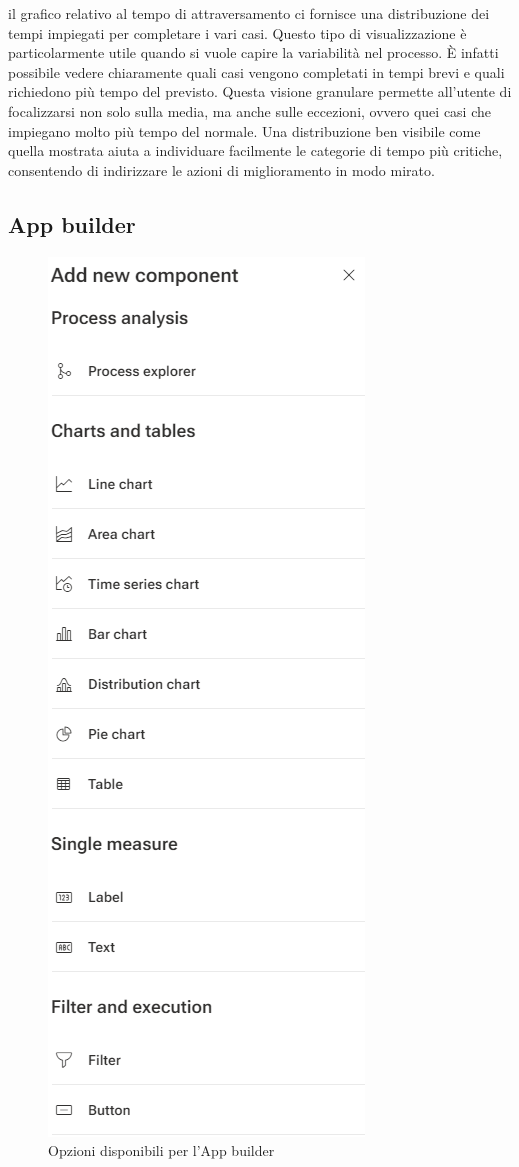 \documentclass{article}
\begin{document}
il grafico relativo al tempo di attraversamento ci fornisce una distribuzione dei tempi impiegati per completare i vari casi. Questo tipo di visualizzazione è particolarmente utile quando si vuole capire la variabilità nel processo. È infatti possibile vedere chiaramente quali casi vengono completati in tempi brevi e quali richiedono più tempo del previsto. Questa visione granulare permette all’utente di focalizzarsi non solo sulla media, ma anche sulle eccezioni, ovvero quei casi che impiegano molto più tempo del normale. Una distribuzione ben visibile come quella mostrata aiuta a individuare facilmente le categorie di tempo più critiche, consentendo di indirizzare le azioni di miglioramento in modo mirato.

\subsection{App builder}
\begin{figure}[H]
    \centering
    \includegraphics{imgARIS/Simulazione/AppBuilderSimulazione.png}
    \caption{Opzioni disponibili per l'App builder}
    \label{fig:options-app-builder}
\end{figure}
\end{document}
